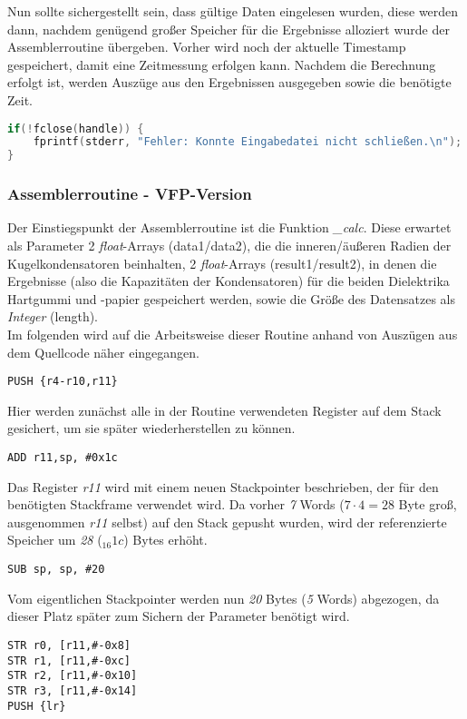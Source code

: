 \documentclass[11pt]{scrartcl}
\begin{document}
Nun sollte sichergestellt sein, dass gültige Daten eingelesen wurden, diese werden dann, nachdem genügend großer Speicher für die Ergebnisse alloziert wurde der Assemblerroutine übergeben. Vorher wird noch der aktuelle Timestamp gespeichert, damit eine Zeitmessung erfolgen kann. Nachdem die Berechnung erfolgt ist, werden Auszüge aus den Ergebnissen ausgegeben sowie die benötigte Zeit.

\begin{lstlisting}[language=C]
if(!fclose(handle)) {
	fprintf(stderr, "Fehler: Konnte Eingabedatei nicht schließen.\n");
}
\end{lstlisting}

\subsubsection{Assemblerroutine - VFP-Version}
Der Einstiegspunkt der Assemblerroutine ist die Funktion \emph{\_calc}. Diese erwartet als Parameter 2 \emph{float}-Arrays (data1/data2), die die inneren/äußeren Radien der Kugelkondensatoren beinhalten, 2 \emph{float}-Arrays (result1/result2), in denen die Ergebnisse (also die Kapazitäten der Kondensatoren) für die beiden Dielektrika Hartgummi und -papier gespeichert werden, sowie die Größe des Datensatzes als \emph{Integer} (length).\\
Im folgenden wird auf die Arbeitsweise dieser Routine anhand von Auszügen aus dem Quellcode näher eingegangen.
\begin{verbatim}
PUSH {r4-r10,r11}
\end{verbatim}
Hier werden zunächst alle in der Routine verwendeten Register auf dem Stack gesichert, um sie später wiederherstellen zu können.
\begin{verbatim}
ADD r11,sp, #0x1c
\end{verbatim}
Das Register \emph{r11} wird mit einem neuen Stackpointer beschrieben, der für den benötigten Stackframe verwendet wird. Da vorher \emph{7} Words ($7 \cdot 4 = 28$ Byte groß, ausgenommen \emph{r11} selbst) auf den Stack gepusht wurden, wird der referenzierte Speicher um \emph{28} ($_{16}1c$) Bytes erhöht. 
\begin{verbatim}
SUB sp, sp, #20
\end{verbatim}
Vom eigentlichen Stackpointer werden nun \emph{20} Bytes (\emph{5} Words) abgezogen, da dieser Platz später zum Sichern der Parameter benötigt wird.
\begin{verbatim}
STR r0, [r11,#-0x8]
STR r1, [r11,#-0xc]
STR r2, [r11,#-0x10]
STR r3, [r11,#-0x14]
PUSH {lr}
\end{verbatim}
\end{document}
